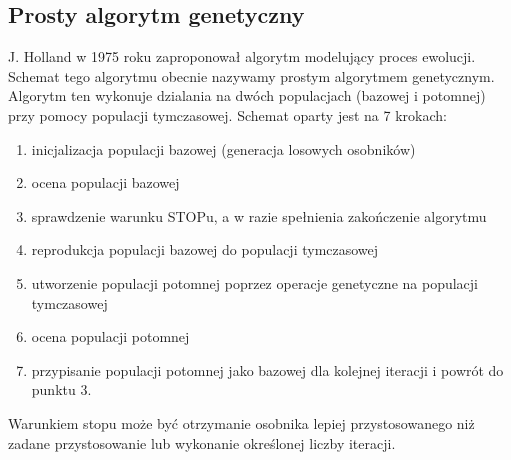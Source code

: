 \documentclass[12pt,a4paper]{article}
\begin{document}
\subsection{Prosty algorytm genetyczny}
\indent J. Holland w 1975 roku zaproponował algorytm modelujący proces ewolucji. Schemat tego algorytmu obecnie nazywamy prostym algorytmem genetycznym. Algorytm ten wykonuje dzialania na dwóch populacjach (bazowej i potomnej) przy pomocy populacji tymczasowej. Schemat oparty jest na 7 krokach:
\begin{enumerate}
\item inicjalizacja populacji bazowej (generacja losowych osobników)
\item ocena populacji bazowej
\item sprawdzenie warunku STOPu, a w razie spełnienia zakończenie algorytmu
\item reprodukcja populacji bazowej do populacji tymczasowej
\item utworzenie populacji potomnej poprzez operacje genetyczne na populacji tymczasowej
\item ocena populacji potomnej
\item przypisanie populacji potomnej jako bazowej dla kolejnej iteracji i powrót do punktu 3.
\end{enumerate}
Warunkiem stopu może być otrzymanie osobnika lepiej przystosowanego niż zadane przystosowanie lub wykonanie określonej liczby iteracji.
\end{document}
